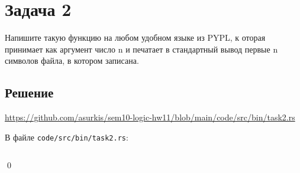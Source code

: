 \section{Задача 2}
Напишите такую функцию на любом удобном языке из PYPL, к
оторая принимает как аргумент число n и печатает в
стандартный вывод первые n символов файла,
в котором записана.

\subsection{Решение}
\url{https://github.com/asurkis/sem10-logic-hw11/blob/main/code/src/bin/task2.rs}

В файле \texttt{code/src/bin/task2.rs}:

\inputminted{rust}{code/src/bin/task2.rs}

\qed
